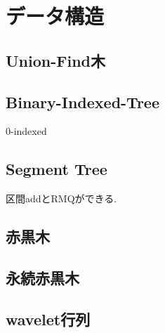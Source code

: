 \section{データ構造}
\subsection{Union-Find木}

\subsection{Binary-Indexed-Tree}
0-indexed

\subsection{Segment Tree}
区間addとRMQができる.

\subsection{赤黒木}

\subsection{永続赤黒木}

\subsection{wavelet行列}


